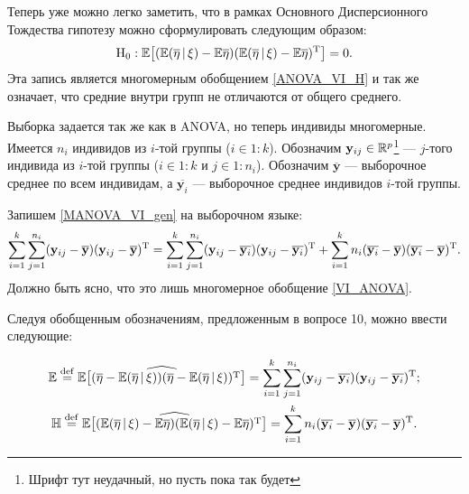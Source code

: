 Теперь уже можно легко заметить, что в рамках Основного Дисперсионного Тождества гипотезу можно сформулировать следующим образом:
\begin{gather}
    \label{MANOVA_VI_H}
    \mathrm H_0:
    \mathbb E \big[(\mathbb E (\overline \eta \, | \, \xi) - \mathbb E \overline \eta)
              (\mathbb E (\overline \eta \, | \, \xi) - \mathbb E \overline \eta)^{\mathrm{T}}\big]
    = 0.
\end{gather}
Эта запись является многомерным обобщением \eqref{ANOVA_VI_H} и так же означает, что средние внутри групп не отличаются от общего среднего.

Выборка задается так же как в ANOVA, но теперь индивиды многомерные.
Имеется $n_i$ индивидов из $i$-той группы ($i \in 1:k$).
Обозначим $\mathbf y_{ij} \in \mathbb{R}^p$\footnote{\color{blue} Шрифт тут неудачный, но пусть пока так будет}
--- $j$-того индивида из $i$-той группы ($i \in 1:k$ и $j \in 1:n_i$).
Обозначим $\overline {\mathbf y}$ --- выборочное среднее по всем индивидам, а $\overline {\mathbf y_i}$
--- выборочное среднее индивидов $i$-той группы.

Запишем \eqref{MANOVA_VI_gen} на выборочном языке:
\begin{gather}
    \label{VI_MANOVA}
    \sum_{i=1}^k \sum_{j=1}^{n_i} (\mathbf y_{ij} - \overline {\mathbf y}) (\mathbf y_{ij} - \overline {\mathbf y})^{\mathrm{T}} =
    \sum_{i=1}^k \sum_{j=1}^{n_i} (\mathbf y_{ij} - \overline {\mathbf y_i}) (\mathbf y_{ij} - \overline {\mathbf y_i})^{\mathrm{T}} +
    \sum_{i=1}^k n_i (\overline {\mathbf y_i} - \overline {\mathbf y}) (\overline {\mathbf y_i} - \overline {\mathbf y})^{\mathrm{T}}.
\end{gather}
Должно быть ясно, что это лишь многомерное обобщение \eqref{VI_ANOVA}.

Следуя обобщенным обозначениям, предложенным в вопросе 10, можно ввести следующие:

\begin{gather*}
    \mathrm {\mathbb E} \overset{\mathrm{def}}{=}
    \widehat {\mathbb E \big[(\overline \eta - \mathbb E (\overline \eta \, | \, \xi)) 
    (\overline \eta - \mathbb E (\overline \eta \, | \, \xi))^{\mathrm{T}}\big]} =
    \sum_{i=1}^k \sum_{j=1}^{n_i} (\mathbf y_{ij} - \overline {\mathbf y_i}) (\mathbf y_{ij} - \overline {\mathbf y_i})^{\mathrm{T}};\\
    \mathrm {\mathbb H} \overset{\mathrm{def}}{=}
    \widehat{\mathbb E \big[(\mathbb E (\overline \eta \, | \, \xi) - \mathbb E \overline \eta)
    (\mathbb E (\overline \eta \, | \, \xi) - \mathbb E \overline \eta)^{\mathrm{T}}\big]} = 
    \sum_{i=1}^k n_i (\overline {\mathbf y_i} - \overline {\mathbf y}) (\overline {\mathbf y_i} - \overline {\mathbf y})^{\mathrm{T}}.
\end{gather*}

